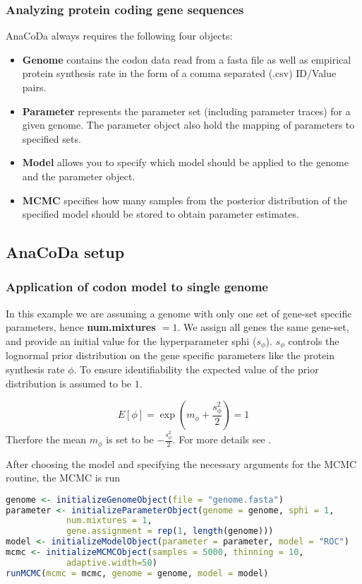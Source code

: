 \subsubsection{Analyzing protein coding gene sequences}
AnaCoDa always requires the following four objects:
\begin{itemize}
	\item \textbf{Genome} contains the codon data read from a fasta file as well as empirical protein synthesis rate in
the form of a comma separated (.csv) ID/Value pairs.
	\item \textbf{Parameter} represents the parameter set (including parameter traces) for a given genome. The
parameter object also hold the mapping of parameters to specified sets.
	\item \textbf{Model} allows you to specify which model should be applied to the genome and the parameter object.
	\item \textbf{MCMC} specifies how many samples from the posterior distribution of the specified model should be
stored to obtain parameter estimates.
\end{itemize}

\subsection{AnaCoDa setup}
\subsubsection{Application of codon model to single genome}
In this example we are assuming a genome with only one set of gene-set specific parameters, hence \textbf{num.mixtures $ = 1$}. 
We assign all genes the same gene-set, and provide an initial value for the hyperparameter sphi ($s_\phi$). $s_\phi$ controls the lognormal prior distribution on the gene specific parameters like the protein synthesis rate $\phi$. 
To ensure identifiability the expected value of the prior distribution is assumed to be $1$.

\begin{equation}
E[\phi] = \exp\left(m_\phi + \frac{s^2_\phi}{2}\right) = 1
\end{equation}
Therfore the mean $m_\phi$ is set to be $-\frac{s^2_\phi}{2}$.
For more details see \citet{gilchrist2015}.

After choosing the model and specifying the necessary arguments for the MCMC routine, the MCMC is run

\begin{lstlisting}[language=R]
genome <- initializeGenomeObject(file = "genome.fasta")
parameter <- initializeParameterObject(genome = genome, sphi = 1, 
			num.mixtures = 1, 
			gene.assignment = rep(1, length(genome)))
model <- initializeModelObject(parameter = parameter, model = "ROC")
mcmc <- initializeMCMCObject(samples = 5000, thinning = 10, 
			adaptive.width=50)
runMCMC(mcmc = mcmc, genome = genome, model = model)
\end{lstlisting}

